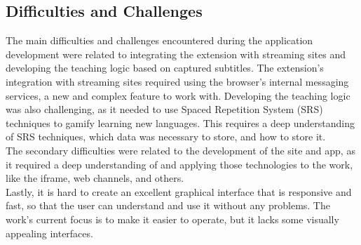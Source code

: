 \documentclass[12pt]{article}
\begin{document}
\subsection{Difficulties and Challenges}
The main difficulties and challenges encountered during the application development were related to integrating the extension with streaming sites and developing the teaching logic based on captured subtitles. The extension's integration with streaming sites required using the browser's internal messaging services, a new and complex feature to work with. Developing the teaching logic was also challenging, as it needed to use Spaced Repetition System (SRS) techniques to gamify learning new languages. This requires a deep understanding of SRS techniques, which data was necessary to store, and how to store it. \\
The secondary difficulties were related to the development of the site and app, as it required a deep understanding of and applying those technologies to the work, like the iframe, web channels, and others. \\
Lastly, it is hard to create an excellent graphical interface that is responsive and fast, so that the user can understand and use it without any problems. The work's current focus is to make it easier to operate, but it lacks some visually appealing interfaces.
\end{document}
